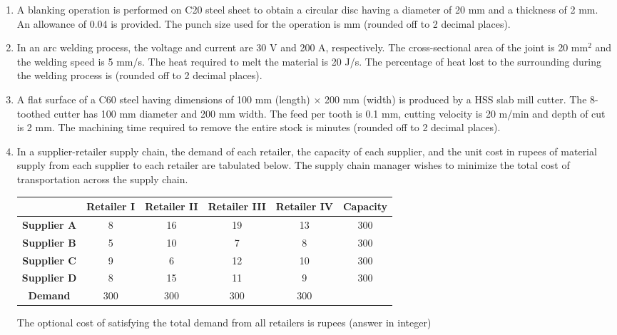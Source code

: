 \documentclass[journal,,12pt,onecolumn]{IEEEtran}
\theoremstyle{remark}
\begin{document}
\begin{enumerate}
\bigskip
\item A blanking operation is performed on C20 steel sheet to obtain a circular disc having a diameter of 20 mm and a thickness of 2 mm. An allowance of 0.04 is provided. The punch size used for the operation is \underline{\hspace{2cm}} mm (rounded off to 2 decimal places).
\bigskip
\item In an arc welding process, the voltage and current are 30 V and 200 A, respectively. The cross-sectional area of the joint is 20 mm\(^2\) and the welding speed is 5 mm/s. The heat required to melt the material is 20 J/s. The percentage of heat lost to the surrounding during the welding process is \underline{\hspace{2cm}} (rounded off to 2 decimal places).
\bigskip
\item A flat surface of a C60 steel having dimensions of 100 mm (length) \(\times\) 200 mm (width) is produced by a HSS slab mill cutter. The 8-toothed cutter has 100 mm diameter and 200 mm width. The feed per tooth is 0.1 mm, cutting velocity is 20 m/min and depth of cut is 2 mm. The machining time required to remove the entire stock is \underline{\hspace{2cm}} minutes (rounded off to 2 decimal places).
\bigskip
\item In a supplier-retailer supply chain, the demand of each retailer, the capacity of each supplier, and the unit cost in rupees of material supply from each supplier to each retailer are tabulated below. The supply chain manager wishes to minimize the total cost of transportation across the supply chain.

\begin{center}
    \begin{tabular}{|c|c|c|c|c|c|}
        \hline
        & \textbf{Retailer I} & \textbf{Retailer II} & \textbf{Retailer III} & \textbf{Retailer IV} & \textbf{Capacity} \\
        \hline
        \textbf{Supplier A} & 8 & 16 & 19 & 13 & 300 \\
        \hline
        \textbf{Supplier B} & 5 & 10 & 7 & 8 & 300 \\
        \hline
        \textbf{Supplier C} & 9 & 6 & 12 & 10 & 300 \\
        \hline
        \textbf{Supplier D} & 8 & 15 & 11 & 9 & 300 \\
        \hline
        \textbf{Demand} & 300 & 300 & 300 & 300 & \\
        \hline
    \end{tabular}
\end{center}
The optional cost of satisfying the total demand from all retailers is \underline{\hspace{1cm}} rupees (answer in integer)
\end{enumerate}
\end{document}
